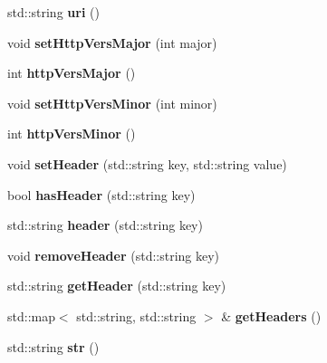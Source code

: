 \begin{DoxyCompactItemize}
std\+::string {\bfseries uri} ()
\item 
\mbox{\label{class_message_base_af56fe4e5b5a2857e7a2c95a1869c616b}} 
void {\bfseries set\+Http\+Vers\+Major} (int major)
\item 
\mbox{\label{class_message_base_aefe31e700e9ed8af32229e24fddd8663}} 
int {\bfseries http\+Vers\+Major} ()
\item 
\mbox{\label{class_message_base_a3d0ed46204dbf8357cce7106906a139d}} 
void {\bfseries set\+Http\+Vers\+Minor} (int minor)
\item 
\mbox{\label{class_message_base_ae876fd4350b0413030a0c5385086bcc8}} 
int {\bfseries http\+Vers\+Minor} ()
\item 
\mbox{\label{class_message_base_aac4e29eb8556be7359c5d3259e09005e}} 
void {\bfseries set\+Header} (std\+::string key, std\+::string value)
\item 
\mbox{\label{class_message_base_a5d74045a5918ebb0b6a337e35d26993e}} 
bool {\bfseries has\+Header} (std\+::string key)
\item 
\mbox{\label{class_message_base_a789c4f9ca6f44823daa8a1059f311590}} 
std\+::string {\bfseries header} (std\+::string key)
\item 
\mbox{\label{class_message_base_a98645e19e2b6722d581459bdd6c146dd}} 
void {\bfseries remove\+Header} (std\+::string key)
\item 
\mbox{\label{class_message_base_acf5d8a221c5c9a7d1a02c9c55798dda9}} 
std\+::string {\bfseries get\+Header} (std\+::string key)
\item 
\mbox{\label{class_message_base_a69869f3d0a88514d8254c583c707a3ec}} 
std\+::map$<$ std\+::string, std\+::string $>$ \& {\bfseries get\+Headers} ()
\item 
\mbox{\label{class_message_base_a2a6e0f2ebd74554871c2d1ceb13ad8a4}} 
std\+::string {\bfseries str} ()

\end{DoxyCompactItemize}
